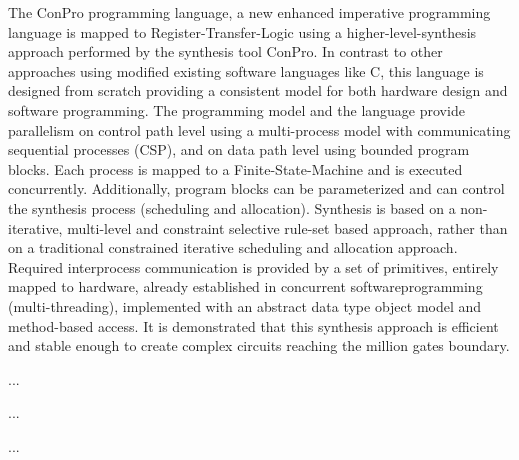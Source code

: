 \documentclass[a4paper,12pt,twoside,english]{article}
\begin{document}
\def\thesection{\tocI}
\secI{\label{toclabelI}1\hfill\thesection}
The ConPro programming language, a new enhanced  imperative programming language is mapped to
Register-Transfer-Logic using a  higher-level-synthesis approach performed by the synthesis tool ConPro. In contrast to other approaches using modified existing
software languages like C, this language is designed from scratch providing a consistent model for  both hardware design and software programming. The
programming model and the language provide parallelism on control path level using a multi-process model with communicating sequential processes (CSP), and on
data path level using bounded program blocks. Each process is mapped to a Finite-State-Machine and is executed concurrently. Additionally, program blocks can be
parameterized and can control the synthesis process (scheduling and allocation). Synthesis is  based on a non-iterative, multi-level and constraint selective
rule-set based  approach,  rather than  on a traditional constrained iterative scheduling and allocation approach.  Required  interprocess communication is
provided by a set of primitives, entirely mapped to hardware, already established in concurrent softwareprogramming (multi-threading), implemented with an
abstract data type object model and method-based access. It is demonstrated that this synthesis approach is efficient and stable enough to create complex
circuits reaching the million gates boundary.


\vskip5pt


\vskip10pt
\def\thesubsubsection{\vrule width 0pt height 1.3 ex}

\def\thesubsection{\vrule width 0pt height 1.3 ex}

\def\thesection{\tocII}
\secI{\label{toclabelII}2\hfill\thesection}
...


\vskip5pt



\vskip5pt

\def\thesubsubsection{\vrule width 0pt height 1.3 ex}

\def\thesubsection{\tocIII}
\secII{\label{toclabelIII}\thesubsection}
...


\vskip5pt



\def\thesubsubsection{\vrule width 0pt height 1.3 ex}

\def\thesubsection{\tocIV}
\secII{\label{toclabelIV}\thesubsection}
...
\end{document}
